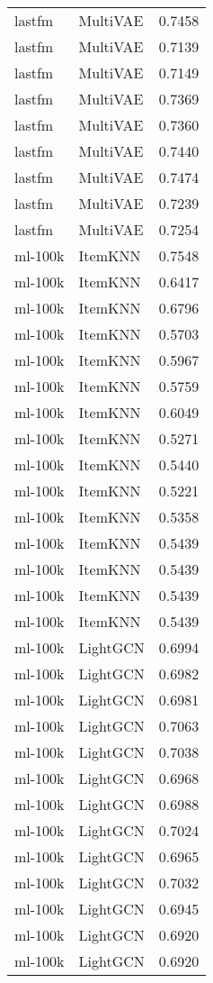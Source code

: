 \begin{table}[htbp]
\begin{tabular}{llr}
lastfm & MultiVAE & 0.7458 \\
lastfm & MultiVAE & 0.7139 \\
lastfm & MultiVAE & 0.7149 \\
lastfm & MultiVAE & 0.7369 \\
lastfm & MultiVAE & 0.7360 \\
lastfm & MultiVAE & 0.7440 \\
lastfm & MultiVAE & 0.7474 \\
lastfm & MultiVAE & 0.7239 \\
lastfm & MultiVAE & 0.7254 \\
ml-100k & ItemKNN & 0.7548 \\
ml-100k & ItemKNN & 0.6417 \\
ml-100k & ItemKNN & 0.6796 \\
ml-100k & ItemKNN & 0.5703 \\
ml-100k & ItemKNN & 0.5967 \\
ml-100k & ItemKNN & 0.5759 \\
ml-100k & ItemKNN & 0.6049 \\
ml-100k & ItemKNN & 0.5271 \\
ml-100k & ItemKNN & 0.5440 \\
ml-100k & ItemKNN & 0.5221 \\
ml-100k & ItemKNN & 0.5358 \\
ml-100k & ItemKNN & 0.5439 \\
ml-100k & ItemKNN & 0.5439 \\
ml-100k & ItemKNN & 0.5439 \\
ml-100k & ItemKNN & 0.5439 \\
ml-100k & LightGCN & 0.6994 \\
ml-100k & LightGCN & 0.6982 \\
ml-100k & LightGCN & 0.6981 \\
ml-100k & LightGCN & 0.7063 \\
ml-100k & LightGCN & 0.7038 \\
ml-100k & LightGCN & 0.6968 \\
ml-100k & LightGCN & 0.6988 \\
ml-100k & LightGCN & 0.7024 \\
ml-100k & LightGCN & 0.6965 \\
ml-100k & LightGCN & 0.7032 \\
ml-100k & LightGCN & 0.6945 \\
ml-100k & LightGCN & 0.6920 \\
ml-100k & LightGCN & 0.6920 \\

\end{tabular}
\end{table}
